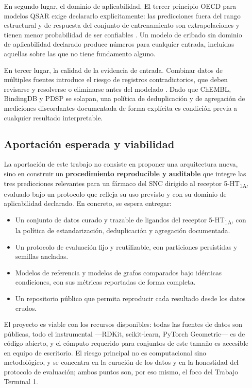 En segundo lugar, el dominio de aplicabilidad. El tercer principio OECD para
modelos QSAR exige declararlo explícitamente: las predicciones fuera del rango
estructural y de respuesta del conjunto de entrenamiento son extrapolaciones y
tienen menor probabilidad de ser confiables \cite{czub_automlbased_2022}. Un modelo de
cribado sin dominio de aplicabilidad declarado produce números para cualquier
entrada, incluidas aquellas sobre las que no tiene fundamento alguno.

En tercer lugar, la calidad de la evidencia de entrada. Combinar datos de
múltiples fuentes introduce el riesgo de registros contradictorios, que deben
revisarse y resolverse o eliminarse antes del modelado \cite{faramarzi_development_2022}.
Dado que ChEMBL, BindingDB y PDSP se solapan, una política de deduplicación y de
agregación de mediciones discordantes documentada de forma explícita es
condición previa a cualquier resultado interpretable.

\subsection{Aportación esperada y viabilidad}
\label{sec:just-aportacion}

La aportación de este trabajo no consiste en proponer una arquitectura nueva,
sino en construir un \textbf{procedimiento reproducible y auditable} que integre
las tres predicciones relevantes para un fármaco del SNC dirigido al receptor
5-HT\textsubscript{1A}, evaluado bajo un protocolo que refleja su uso previsto y
con su dominio de aplicabilidad declarado. En concreto, se espera entregar:

\begin{itemize}
  \item Un conjunto de datos curado y trazable de ligandos del receptor
        5-HT\textsubscript{1A}, con la política de estandarización,
        deduplicación y agregación documentada.
  \item Un protocolo de evaluación fijo y reutilizable, con particiones
        persistidas y semillas ancladas.
  \item Modelos de referencia y modelos de grafos comparados bajo idénticas
        condiciones, con sus métricas reportadas de forma completa.
  \item Un repositorio público que permita reproducir cada resultado desde los
        datos crudos.
\end{itemize}

El proyecto es viable con los recursos disponibles: todas las fuentes de datos
son públicas, todo el instrumental —RDKit, scikit-learn, PyTorch Geometric—
es de código abierto, y el cómputo requerido para conjuntos de este tamaño es
accesible en equipo de escritorio. El riesgo principal no es computacional sino
metodológico, y se concentra en la curación de los datos y en la honestidad del
protocolo de evaluación; ambos puntos son, por eso mismo, el foco del Trabajo
Terminal 1.


